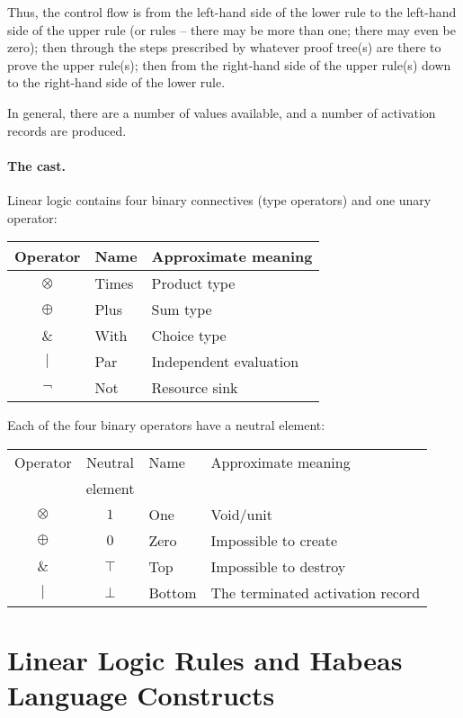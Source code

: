 \documentclass[a4paper]{article}
\begin{document}
Thus, the control flow is from the left-hand side of the lower rule to
the left-hand side of the upper rule (or rules -- there may be more
than one; there may even be zero); then through the steps prescribed
by whatever proof tree(s) are there to prove the upper rule(s); then
from the right-hand side of the upper rule(s) down to the right-hand
side of the lower rule.

In general, there are a number of values available, and a number of
activation records are produced.

\paragraph{The cast.} Linear logic contains four binary connectives (type operators) and
one unary operator:
\begin{center}
  \begin{tabular}{c|l|l}
    \hline
    \hline
    Operator & Name & Approximate meaning\\
    \hline
    $\otimes$ & Times & Product type\\
    $\oplus$  & Plus  & Sum type\\
    $\&$      & With  & Choice type\\
    $|$       & Par   & Independent evaluation\\
    \hline
    $\lnot$   & Not   & Resource sink\\
    \hline
  \end{tabular}
\end{center}

Each of the four binary operators have a neutral element:
\begin{center}
  \begin{tabular}{c|c|l|l}
    \hline
    \hline
    Operator & Neutral & Name & Approximate meaning\\
             & element &&\\
    \hline
    $\otimes$ & $1$    & One    & Void/unit\\
    $\oplus$  & $0$    & Zero   & Impossible to create\\
    $\&$      & $\top$ & Top    & Impossible to destroy\\
    $|$       & $\bot$ & Bottom & The terminated activation record\\
    \hline
  \end{tabular}
\end{center}

\section{Linear Logic Rules and Habeas Language Constructs}
\end{document}
